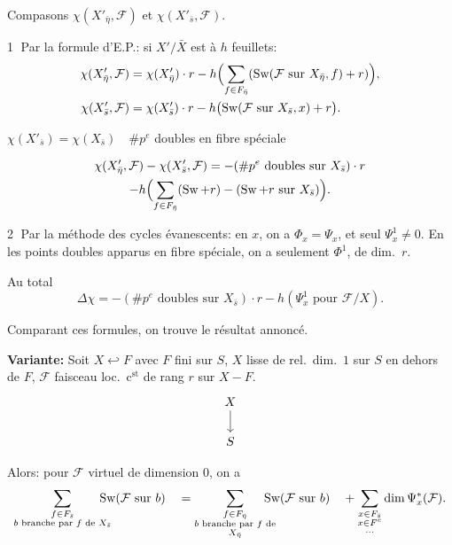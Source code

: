\documentclass[11pt,a4paper]{article}
\theoremstyle{plain}
\theoremstyle{definition}
\DeclareMathOperator{\Sw}{Sw}
\begin{document}
\newpage

Compasons $\chi(X'_{\bar{\eta}}, \mathcal{F})$ et $\chi(X'_{\bar{s}}, \mathcal{F})$.

\textcircled{1} Par la formule d'E.P.: si $X'/\bar{X}$ est \`a $h$ feuillets:
\begin{align*}
\chi(X'_{\bar{\eta}}, \mathcal{F}) &= \chi(X'_{\bar{\eta}}) \cdot r - h\Bigl(\sum_{f \in F_{\bar{\eta}}} (\Sw(\mathcal{F} \text{ sur } X_{\bar{\eta}}, f) + r)\Bigr), \\
\chi(X'_{\bar{s}}, \mathcal{F}) &= \chi(X'_{\bar{s}}) \cdot r - h\bigl(\Sw(\mathcal{F} \text{ sur } X_{\bar{s}}, x) + r\bigr).
\end{align*}

$\chi(X'_{\bar{s}}) = \chi(X_{\bar{s}}) \quad \# p^e$ doubles en fibre sp\'eciale

\begin{multline*}
\chi(X'_{\bar{\eta}}, \mathcal{F}) - \chi(X'_{\bar{s}}, \mathcal{F}) = -(\# p^e \text{ doubles sur } X_{\bar{s}}) \cdot r \\
- h\Bigl(\sum_{f \in F_{\bar{\eta}}} (\Sw + r) - (\Sw + r \text{ sur } X_{\bar{s}})\Bigr).
\end{multline*}

\textcircled{2} Par la m\'ethode des cycles \'evanescents: en $x$, on a $\Phi_x = \Psi_x$, et seul $\Psi_x^1 \neq 0$. En les points doubles apparus en fibre sp\'eciale, on a seulement $\Phi^1$, de dim.\ $r$.

Au total
\[
\Delta\chi = -(\# p^e \text{ doubles sur } X_{\bar{s}}) \cdot r - h(\Psi_x^1 \text{ pour } \mathcal{F}/X).
\]

Comparant ces formules, on trouve le r\'esultat annonc\'e.

\medskip

\noindent \textbf{Variante:} Soit $X \hookleftarrow F$ avec $F$ fini sur $S$, $X$ lisse de rel.\ dim.\ $1$ sur $S$ en dehors de $F$, $\mathcal{F}$ faisceau loc.\ c$^{\text{st}}$ de rang $r$ sur $X - F$.
\[
\begin{tikzcd}
X \arrow[d] \\
S
\end{tikzcd}
\]

\medskip

Alors: pour $\mathcal{F}$ virtuel de dimension $0$, on a
\[
\sum_{\substack{f \in F_{\bar{s}} \\ b \text{ branche par } f \text{ de } X_{\bar{s}}}}
\mspace{-20mu}
\Sw(\mathcal{F} \text{ sur } b) \quad
= \sum_{\substack{f \in F_{\bar{\eta}} \\ b \text{ branche par } f \text{ de} \\ X_{\bar{\eta}}}}
\mspace{-20mu}
\Sw(\mathcal{F} \text{ sur } b) \quad
+ \sum_{\substack{x \in F_{\bar{s}} \\ x \in F^c \\ \ldots}} \dim \Psi_x^*(\mathcal{F}).
\]
\end{document}
